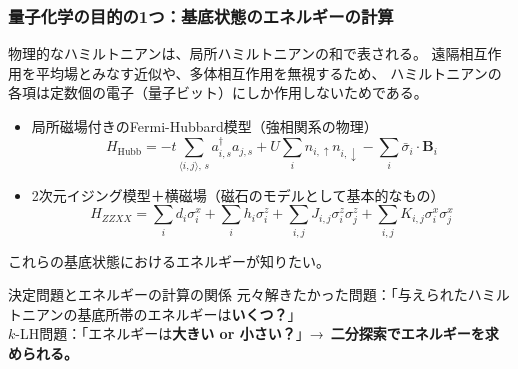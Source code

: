 \documentclass[11pt,aspectratio=169,xcolor=dvipsnames,table,dvipdfmx]{beamer}
\theoremstyle{definition}
\begin{document}
\begin{frame}
  \frametitle{量子化学の目的の1つ：基底状態のエネルギーの計算}
  物理的なハミルトニアンは、局所ハミルトニアンの和で表される。
  遠隔相互作用を平均場とみなす近似や、多体相互作用を無視するため、
  ハミルトニアンの各項は定数個の電子（量子ビット）にしか作用しないためである。
  \begin{itemize}
    \item 局所磁場付きのFermi-Hubbard模型（強相関系の物理）
    \begin{equation}
      H_{\text{Hubb}}=-t\sum_{\langle i,j\rangle,\,s}a^{\dagger}_{i,s}a_{j,s} + U\sum_{i}n_{i,\uparrow}n_{i,\downarrow} 
        - \sum_{i}\bar{\sigma}_i\cdot\bm{B}_i
    \end{equation}
    \item 2次元イジング模型＋横磁場（磁石のモデルとして基本的なもの）
    \begin{equation}
      H_{ZZXX} = \sum_{i}d_i\sigma^{x}_i + \sum_{i}h_i\sigma^{z}_i + \sum_{i,j}J_{i,j}\sigma^{z}_i\sigma^{z}_j + \sum_{i,j}K_{i,j}\sigma^{x}_i\sigma^{x}_j
    \end{equation}
  \end{itemize}
これらの基底状態におけるエネルギーが知りたい。
\begin{block}{決定問題とエネルギーの計算の関係}
  元々解きたかった問題：「与えられたハミルトニアンの基底所帯のエネルギーは{\color{red}\textbf{いくつ？}}」\\
  $k$-LH問題：「エネルギーは{\color{blue}\textbf{大きい or 小さい？}}」→~{\color{red}\textbf{二分探索でエネルギーを求められる。}}
\end{block}
\end{frame}
\end{document}
